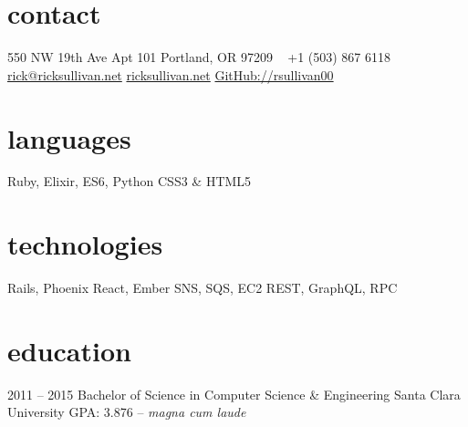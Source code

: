 \documentclass[]{friggeri-cv} %
\begin{document}


\begin{aside} %
\section{contact}
550 NW 19th Ave
Apt 101
Portland, OR 97209
~
+1 (503) 867 6118
~
\href{mailto:rick@ricksullivan.net}{rick@ricksullivan.net}
\href{https://ricksullivan.net}{ricksullivan.net}
\href{https://github.com/rsullivan00}{GitHub://rsullivan00}
%
\section{languages}
Ruby, Elixir, ES6, Python
CSS3 \& HTML5
%
\section{technologies}
Rails, Phoenix
React, Ember
SNS, SQS, EC2
REST, GraphQL, RPC
\end{aside}

\section{education}

\begin{entrylist}

\entry
{2011 -- 2015}
{Bachelor of Science {\normalfont in Computer Science \& Engineering}}
{Santa Clara University}
{GPA: 3.876 -- \emph{magna cum laude}}



\end{entrylist}

\end{document}
